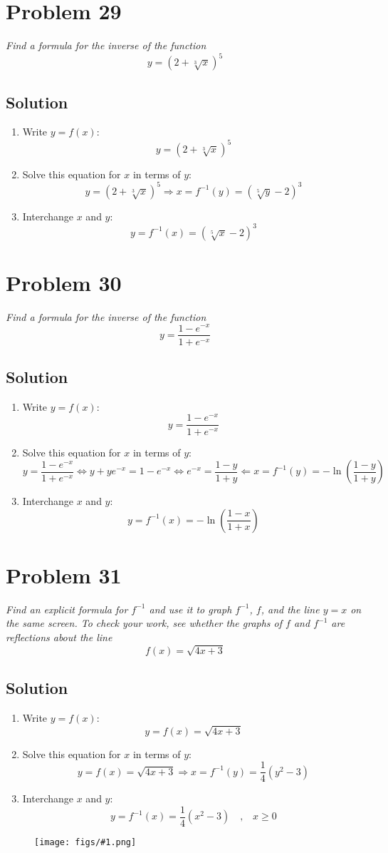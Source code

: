 \documentclass[11pt]{article}
\newcommand{\soln}{\subsection*}
\newcommand{\qn}{\textit}
\newcommand{\imgsoln}[1]{
	\begin{figure}[H]
		\centering
		\texttt{[image: figs/\#1.png]}
	\end{figure}
}
\newcommand{\eqtext}[1]{\quad\text{#1}\quad}
\begin{document}
\section*{Problem 29}

\qn{Find a formula for the inverse of the function $$y=(2+\sqrt[3]{x})^5$$}

\soln{Solution}
\begin{enumerate}
	\item Write $y=f(x)$: $$y=(2+\sqrt[3]{x})^5$$
	\item Solve this equation for $x$ in terms of $y$: $$y=(2+\sqrt[3]{x})^5 \Rightarrow x=f^{-1}(y)=(\sqrt[5]{y}-2)^3$$
	\item Interchange $x$ and $y$: $$y=f^{-1}(x)=(\sqrt[5]{x}-2)^3$$
\end{enumerate}

\section*{Problem 30}

\qn{Find a formula for the inverse of the function $$y=\frac{1-e^{-x}}{1+e^{-x}}$$}

\soln{Solution}
\begin{enumerate}
	\item Write $y=f(x)$: $$y=\frac{1-e^{-x}}{1+e^{-x}}$$
	\item Solve this equation for $x$ in terms of $y$: $$y=\frac{1-e^{-x}}{1+e^{-x}} \Leftrightarrow y+ye^{-x}=1-e^{-x} \Leftrightarrow e^{-x}=\frac{1-y}{1+y} \Leftarrow x=f^{-1}(y)=-\ln(\frac{1-y}{1+y})$$
	\item Interchange $x$ and $y$: $$y=f^{-1}(x)=-\ln(\frac{1-x}{1+x})$$
\end{enumerate}

\section*{Problem 31}

\qn{Find an explicit formula for $f^{-1}$ and use it to graph $f^{-1}$, $f$, and the line $y=x$ on the same screen. To check your work, see whether the graphs of $f$ and $f^{-1}$ are reflections about the line $$f(x)=\sqrt{4x+3}$$}

\soln{Solution}
\begin{enumerate}
	\item Write $y=f(x)$: $$y=f(x)=\sqrt{4x+3}$$
	\item Solve this equation for $x$ in terms of $y$: $$y=f(x)=\sqrt{4x+3} \Rightarrow x=f^{-1}(y)=\frac{1}{4}(y^2-3)$$
	\item Interchange $x$ and $y$: $$y=f^{-1}(x)=\frac{1}{4}(x^2-3) \eqtext{,} x \ge 0$$
\end{enumerate}
\imgsoln{1.5.31-ans}
\end{document}
